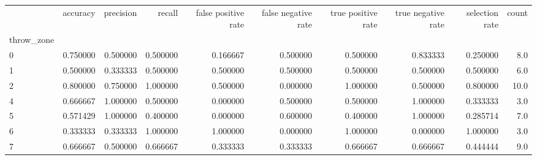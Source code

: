 \begin{tabular}{lrrrrrrrrr}
\toprule
{} &  accuracy &  precision &    recall &  false positive rate &  false negative rate &  true positive rate &  true negative rate &  selection rate &  count \\
throw\_zone &           &            &           &                      &                      &                     &                     &                 &        \\
\midrule
0          &  0.750000 &   0.500000 &  0.500000 &             0.166667 &             0.500000 &            0.500000 &            0.833333 &        0.250000 &    8.0 \\
1          &  0.500000 &   0.333333 &  0.500000 &             0.500000 &             0.500000 &            0.500000 &            0.500000 &        0.500000 &    6.0 \\
2          &  0.800000 &   0.750000 &  1.000000 &             0.500000 &             0.000000 &            1.000000 &            0.500000 &        0.800000 &   10.0 \\
4          &  0.666667 &   1.000000 &  0.500000 &             0.000000 &             0.500000 &            0.500000 &            1.000000 &        0.333333 &    3.0 \\
5          &  0.571429 &   1.000000 &  0.400000 &             0.000000 &             0.600000 &            0.400000 &            1.000000 &        0.285714 &    7.0 \\
6          &  0.333333 &   0.333333 &  1.000000 &             1.000000 &             0.000000 &            1.000000 &            0.000000 &        1.000000 &    3.0 \\
7          &  0.666667 &   0.500000 &  0.666667 &             0.333333 &             0.333333 &            0.666667 &            0.666667 &        0.444444 &    9.0 \\
\bottomrule
\end{tabular}

